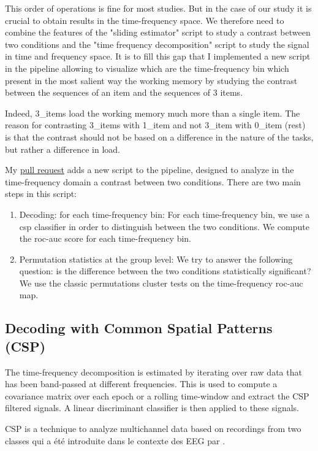 This order of operations is fine for most studies. But in the case of our study it is crucial to obtain results in the time-frequency space. We therefore need to combine the features of the "sliding estimator" script to study a contrast between two conditions and the "time frequency decomposition" script to study the signal in time and frequency space. It is to fill this gap that I implemented a new script in the pipeline allowing to visualize which are the time-frequency bin which present in the most salient way the working memory by studying the contrast between the sequences of an item and the sequences of 3 items. 

Indeed, 3\_items load the working memory much more than a single item. The reason for contrasting 3\_items with 1\_item and not 3\_item with 0\_item (rest) is that the contrast should not be based on a difference in the nature of the tasks, but rather a difference in load.

My \href{https://github.com/mne-tools/mne-bids-pipeline/pull/414}{pull request} adds a new script to the pipeline, designed to analyze in the time-frequency domain a contrast between two conditions. There are two main steps in this script:
\begin{enumerate}
    \item Decoding: for each time-frequency bin: For each time-frequency bin, we use a csp classifier in order to distinguish between the two conditions. We compute the roc-auc score for each time-frequency bin.
    \item Permutation statistics at the group level: We try to answer the following question: is the difference between the two conditions statistically significant? We use the classic permutations cluster tests on the time-frequency roc-auc map.
\end{enumerate}

\subsection{Decoding with Common Spatial Patterns (CSP)}

The time-frequency decomposition is estimated by iterating over raw data that has been band-passed at different frequencies. This is used to compute a
covariance matrix over each epoch or a rolling time-window and extract the CSP
filtered signals. A linear discriminant classifier is then applied to these
signals.

CSP is a technique to analyze multichannel data based on recordings from two classes qui a été introduite dans le contexte des EEG par \cite{koles1990spatial}.

